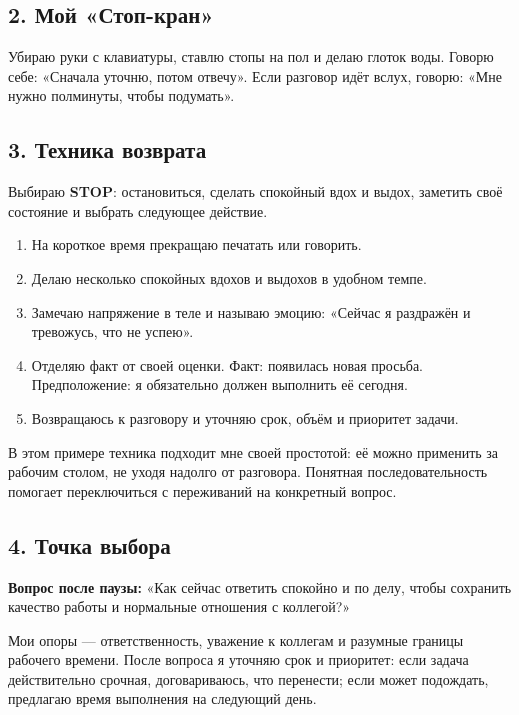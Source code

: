 \documentclass[10pt,a4paper]{article}
\begin{document}
\subsection*{2. Мой «Стоп-кран»}

Убираю руки с клавиатуры, ставлю стопы на пол и делаю глоток воды. Говорю себе: «Сначала уточню, потом отвечу». Если разговор идёт вслух, говорю: «Мне нужно полминуты, чтобы подумать».

\subsection*{3. Техника возврата}

Выбираю \textbf{STOP}: остановиться, сделать спокойный вдох и выдох, заметить своё состояние и выбрать следующее действие.

\begin{enumerate}[leftmargin=*,itemsep=3pt,topsep=3pt]
\item На короткое время прекращаю печатать или говорить.
\item Делаю несколько спокойных вдохов и выдохов в удобном темпе.
\item Замечаю напряжение в теле и называю эмоцию: «Сейчас я раздражён и тревожусь, что не успею».
\item Отделяю факт от своей оценки. Факт: появилась новая просьба. Предположение: я обязательно должен выполнить её сегодня.
\item Возвращаюсь к разговору и уточняю срок, объём и приоритет задачи.
\end{enumerate}

В этом примере техника подходит мне своей простотой: её можно применить за рабочим столом, не уходя надолго от разговора. Понятная последовательность помогает переключиться с переживаний на конкретный вопрос.

\subsection*{4. Точка выбора}

\textbf{Вопрос после паузы:} «Как сейчас ответить спокойно и по делу, чтобы сохранить качество работы и нормальные отношения с коллегой?»

Мои опоры — ответственность, уважение к коллегам и разумные границы рабочего времени. После вопроса я уточняю срок и приоритет: если задача действительно срочная, договариваюсь, что перенести; если может подождать, предлагаю время выполнения на следующий день.
\end{document}
